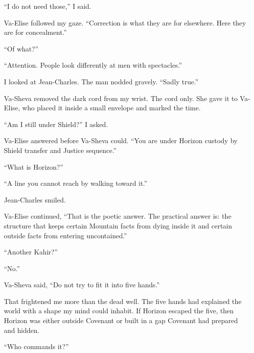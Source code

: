 ``I do not need those,'' I said.\par

Va-Elise followed my gaze. ``Correction is what they are for elsewhere. Here they are for concealment.''\par

``Of what?''\par

``Attention. People look differently at men with spectacles.''\par

I looked at Jean-Charles. The man nodded gravely. ``Sadly true.''\par

Va-Sheva removed the dark cord from my wrist. The cord only. She gave it to Va-Elise, who placed it inside a small envelope and marked the time.\par

``Am I still under Shield?'' I asked.\par

Va-Elise answered before Va-Sheva could. ``You are under Horizon custody by Shield transfer and Justice sequence.''\par

``What is Horizon?''\par

``A line you cannot reach by walking toward it.''\par

Jean-Charles smiled.\par

Va-Elise continued, ``That is the poetic answer. The practical answer is: the structure that keeps certain Mountain facts from dying inside it and certain outside facts from entering uncontained.''\par

``Another Kahir?''\par

``No.''\par

Va-Sheva said, ``Do not try to fit it into five hands.''\par

That frightened me more than the dead well. The five hands had explained the world with a shape my mind could inhabit. If Horizon escaped the five, then Horizon was either outside Covenant or built in a gap Covenant had prepared and hidden.\par

``Who commands it?''\par

